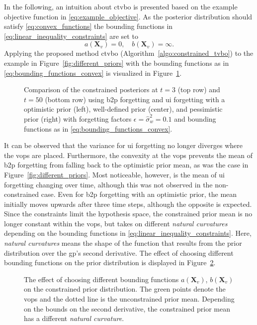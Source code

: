 In the following, an intuition about \gls{ctvbo} is presented based on the example objective function in \eqref{eq:example_objective}. As the posterior distribution should satisfy \eqref{eq:convex_functions} the bounding functions in \eqref{eq:linear_inequality_constraints} are set to
\begin{equation}
    a(\mathbf{X}_v) = 0, \quad b(\mathbf{X}_v) = \infty.
    \label{eq:bounding_functions_convex}
\end{equation}
Applying the proposed method \gls{ctvbo} (Algorithm~\ref{algo:constrained_tvbo}) to the example in Figure~\ref{fig:different_priors} with the bounding functions as in \eqref{eq:bounding_functions_convex} is visualized in Figure~\ref{fig:different_priors_constrained}.
\begin{figure}[h]
    \centering
    
    \caption[Comparing the constrained posteriors for \gls{ui} and \gls{b2p} forgetting for different prior means.]{Comparison of the constrained posteriors at $t=3$ (top row) and $t=50$ (bottom row) using \gls{b2p} forgetting and \gls{ui} forgetting with a optimistic prior (left), well-defined prior (center), and pessimistic prior (right) with forgetting factors $\epsilon=\hat{\sigma}_w^2=0.1$ and bounding functions as in \eqref{eq:bounding_functions_convex}.}
    \label{fig:different_priors_constrained}
\end{figure}
It can be observed that the variance for \gls{ui} forgetting no longer diverges where the \glspl{vop} are placed. Furthermore, the convexity at the \glspl{vop} prevents the mean of \gls{b2p} forgetting from falling back to the optimistic prior mean, as was the case in Figure~\ref{fig:different_priors}. Most noticeable, however, is the mean of \gls{ui} forgetting changing over time, although this was not observed in the non-constrained case. Even for \gls{b2p} forgetting with an optimistic prior, the mean initially moves upwards after three time steps, although the opposite is expected. 
Since the constraints limit the hypothesis space, the constrained prior mean is no longer constant within the \glspl{vop}, but takes on different \emph{natural curvatures} depending on the bounding functions in \eqref{eq:linear_inequality_constraints}. Here, \emph{natural curvatures} means the shape of the function that results from the prior distribution over the \gls{gp}'s second derivative. The effect of choosing different bounding functions on the prior distribution is displayed in Figure~\ref{fig:different_bounds}.
\begin{figure}[h]
    \centering
    
    \caption[Comparing the effect of different bounding functions $a(\mathbf{X}_v)$, $b(\mathbf{X}_v)$ on the constrained prior distribution.]{The effect of choosing different bounding functions $a(\mathbf{X}_v)$, $b(\mathbf{X}_v)$ on the constrained prior distribution. The green points denote the \glspl{vop} and the dotted line is the unconstrained prior mean. Depending on the bounds on the second derivative, the constrained prior mean has a different \emph{natural curvature}.}
    \label{fig:different_bounds}
\end{figure}
